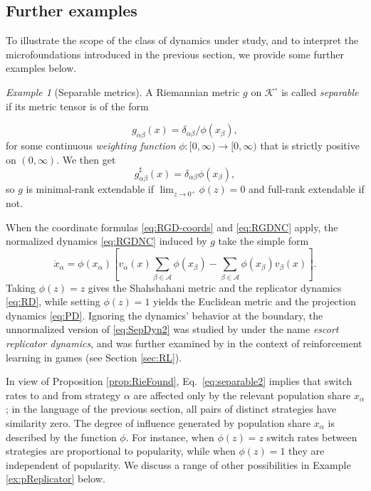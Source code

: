 \documentclass[reqno]{amsart}
\theoremstyle{plain}
\theoremstyle{definition}
\theoremstyle{remark}
\newtheorem{example}[theorem]{Example}
\numberwithin{equation}{section}
\numberwithin{theorem}{section}
\begin{document}
\subsection{Further examples} 
\label{sec:examples}

To illustrate the scope of the class of dynamics under study, and to interpret the microfoundations introduced in the previous section,
we provide some further examples below.

\begin{example}[Separable metrics]
\label{ex:separable}
A Riemannian metric $g$ on ${{\mathcal{K}}^{\circ}}$ is called \emph{separable} if its metric tensor is of the form

\begin{equation}
\label{eq:separable}
g_{\alpha\beta}(x)
	= \delta_{\alpha\beta}/{\phi}(x_{\beta}),
\end{equation}
for some continuous \emph{weighting function} ${\phi} {\colon} [0, \infty) \to [0, \infty)$ that is strictly positive on $(0, \infty)$.
We then get
\begin{equation}
\label{eq:separable2}
g_{\alpha\beta}^\sharp(x) = \delta_{\alpha\beta} {\phi}(x_{\beta}),
\end{equation}
so $g$ is minimal-rank extendable if $\lim_{z \to 0^{+}}\phi(z) = 0$ and full-rank extendable if not.

When the coordinate formulas \eqref{eq:RGD-coords} and \eqref{eq:RGDNC} apply, the normalized dynamics \eqref{eq:RGDNC} induced by $g$ take the simple form 
\begin{equation}
\label{eq:SepDyn2}
\dot x_{\alpha}
	= {\phi}(x_{\alpha})
	\left[
	{v}_{\alpha}(x) \sum_{\beta\in{\mathcal{A}}} {\phi}(x_{\beta}) -\sum_{\beta\in{\mathcal{A}}} {\phi}(x_{\beta}) {v}_{\beta}(x)
	\right].
\end{equation}
Taking ${\phi}(z) = z$ gives the Shahshahani metric and the replicator dynamics \eqref{eq:RD},
while setting 
${\phi}(z) = 1$ yields the Euclidean metric and the projection dynamics \eqref{eq:PD}.
Ignoring the dynamics' behavior at the boundary, the unnormalized version of \eqref{eq:SepDyn2} was studied by \cite{Har11} under the name \emph{escort replicator dynamics}, and was further examined by \cite{MS16} in the context of reinforcement learning in games (see Section \ref{sec:RL}).

In view of Proposition \ref{prop:RieFound}, Eq.~\eqref{eq:separable2} implies that switch rates to and from strategy $\alpha$ are affected only by the relevant population share $x_{\alpha}$; in the language of the previous section, all pairs of distinct strategies have similarity zero.  The degree of influence generated by population share $x_{\alpha}$ is described by the function ${\phi}$.
For instance, when ${\phi}(z) = z$ switch rates between strategies are proportional to popularity, while when ${\phi}(z) = 1$ they are independent of popularity.  
We discuss a range of other possibilities in Example \ref{ex:pReplicator} below.
\end{example}
\end{document}
